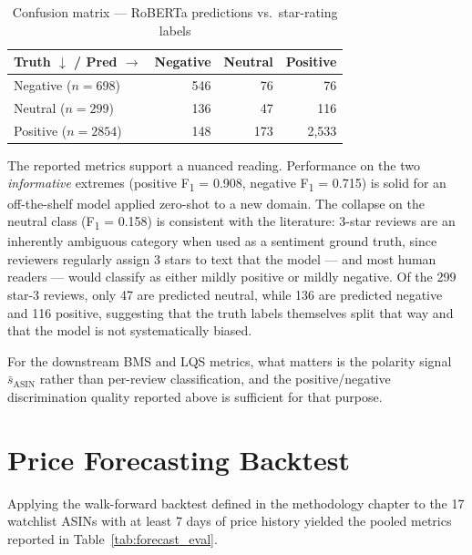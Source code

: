 \begin{table}[H]
  \centering
  \begin{tabular}{lrrr}
    \toprule
    \textbf{Truth $\downarrow$ / Pred $\rightarrow$} & \textbf{Negative} & \textbf{Neutral} & \textbf{Positive} \\
    \midrule
    Negative ($n=698$)  & 546 & 76  & 76   \\
    Neutral  ($n=299$)  & 136 & 47  & 116  \\
    Positive ($n=2854$) & 148 & 173 & 2{,}533 \\
    \bottomrule
  \end{tabular}
  \caption{Confusion matrix --- RoBERTa predictions vs.\ star-rating labels}
  \label{tab:sentiment_confusion}
\end{table}

The reported metrics support a nuanced reading. Performance on the two
\emph{informative} extremes (positive F\textsubscript{1} = 0.908, negative
F\textsubscript{1} = 0.715) is solid for an off-the-shelf model applied
zero-shot to a new domain. The collapse on the neutral class
(F\textsubscript{1} = 0.158) is consistent with the literature: 3-star
reviews are an inherently ambiguous category when used as a sentiment
ground truth, since reviewers regularly assign 3 stars to text that the
model --- and most human readers --- would classify as either mildly
positive or mildly negative. Of the 299 star-3 reviews, only 47 are
predicted neutral, while 136 are predicted negative and 116 positive,
suggesting that the truth labels themselves split that way and that the
model is not systematically biased.

For the downstream BMS and LQS metrics, what matters is the polarity signal
$\bar{s}_{\text{ASIN}}$ rather than per-review classification, and the
positive/negative discrimination quality reported above is sufficient for
that purpose.

\section{Price Forecasting Backtest}

Applying the walk-forward backtest defined in the methodology chapter to
the 17 watchlist ASINs with at least 7 days of price history yielded the
pooled metrics reported in Table~\ref{tab:forecast_eval}.

